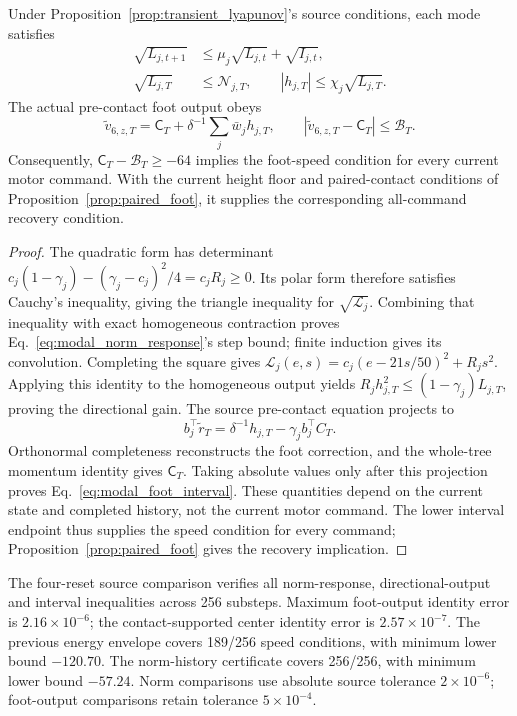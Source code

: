 \begin{proposition}
\label{prop:modal_foot}
Under Proposition~\ref{prop:transient_lyapunov}'s source conditions, each mode satisfies
\begin{align}
 \sqrt{L_{j,t+1}}&\le\mu_j\sqrt{L_{j,t}}+\sqrt{I_{j,t}},\nonumber\\
 \sqrt{L_{j,T}}&\le\mathcal N_{j,T},
 \qquad |h_{j,T}|\le\chi_j\sqrt{L_{j,T}}.
 \label{eq:modal_norm_response}
\end{align}
The actual pre-contact foot output obeys
\begin{equation}
 \widetilde v_{6,z,T}=\mathsf C_T+\delta^{-1}\sum_j\bar w_jh_{j,T},
 \qquad |\widetilde v_{6,z,T}-\mathsf C_T|\le\mathcal B_T.
 \label{eq:modal_foot_interval}
\end{equation}
Consequently, $\mathsf C_T-\mathcal B_T\ge-64$ implies the foot-speed condition for every current motor command.
With the current height floor and paired-contact conditions of Proposition~\ref{prop:paired_foot}, it supplies the corresponding all-command recovery condition.
\end{proposition}

\begin{proof}
The quadratic form has determinant $c_j(1-\gamma_j)-(\gamma_j-c_j)^2/4=c_jR_j\ge0$.
Its polar form therefore satisfies Cauchy's inequality, giving the triangle inequality for $\sqrt{\mathcal L_j}$.
Combining that inequality with exact homogeneous contraction proves Eq.~\eqref{eq:modal_norm_response}'s step bound; finite induction gives its convolution.
Completing the square gives $\mathcal L_j(e,s)=c_j(e-21s/50)^2+R_js^2$.
Applying this identity to the homogeneous output yields $R_jh_{j,T}^2\le(1-\gamma_j)L_{j,T}$, proving the directional gain.
The source pre-contact equation projects to
\begin{equation}
 b_j^\top\widetilde r_T=\delta^{-1}h_{j,T}-\gamma_jb_j^\top C_T.
\end{equation}
Orthonormal completeness reconstructs the foot correction, and the whole-tree momentum identity gives $\mathsf C_T$.
Taking absolute values only after this projection proves Eq.~\eqref{eq:modal_foot_interval}.
These quantities depend on the current state and completed history, not the current motor command.
The lower interval endpoint thus supplies the speed condition for every command; Proposition~\ref{prop:paired_foot} gives the recovery implication.
\end{proof}

The four-reset source comparison verifies all norm-response, directional-output and interval inequalities across 256 substeps.
Maximum foot-output identity error is $2.16\times10^{-6}$; the contact-supported center identity error is $2.57\times10^{-7}$.
The previous energy envelope covers 189/256 speed conditions, with minimum lower bound $-120.70$.
The norm-history certificate covers 256/256, with minimum lower bound $-57.24$.
Norm comparisons use absolute source tolerance $2\times10^{-6}$; foot-output comparisons retain tolerance $5\times10^{-4}$.

